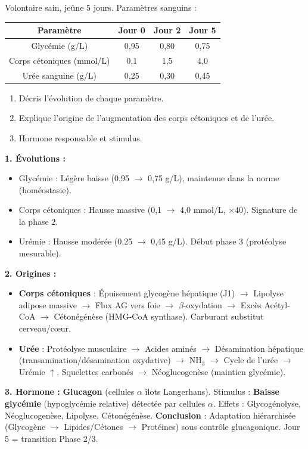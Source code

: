 \documentclass[11pt]{article}
\begin{document}
\begin{exoresolu}
Volontaire sain, jeûne 5 jours. Paramètres sanguins :
\begin{center}
\begin{tabular}{|c|c|c|c|}\hline
\rowcolor{popblueL} Paramètre & Jour 0 & Jour 2 & Jour 5 \\ \hline
Glycémie (g/L) & 0,95 & 0,80 & 0,75 \\ \hline
Corps cétoniques (mmol/L) & 0,1 & 1,5 & 4,0 \\ \hline
Urée sanguine (g/L) & 0,25 & 0,30 & 0,45 \\ \hline
\end{tabular}
\end{center}
\begin{enumerate}
\item Décris l'évolution de chaque paramètre.
\item Explique l'origine de l'augmentation des corps cétoniques et de l'urée.
\item Hormone responsable et stimulus.
\end{enumerate}
\tcblower
\textbf{1. Évolutions :}
\begin{itemize}
\item Glycémie : Légère baisse (0,95 $\rightarrow$ 0,75 g/L), maintenue dans la norme (homéostasie).
\item Corps cétoniques : Hausse massive (0,1 $\rightarrow$ 4,0 mmol/L, $\times 40$). Signature de la phase 2.
\item Urémie : Hausse modérée (0,25 $\rightarrow$ 0,45 g/L). Début phase 3 (protéolyse mesurable).
\end{itemize}
\textbf{2. Origines :}
\begin{itemize}
\item \textbf{Corps cétoniques} : Épuisement glycogène hépatique (J1) $\rightarrow$ Lipolyse adipose massive $\rightarrow$ Flux AG vers foie $\rightarrow$ $\beta$-oxydation $\rightarrow$ Excès Acétyl-CoA $\rightarrow$ Cétonégénèse (HMG-CoA synthase). Carburant substitut cerveau/cœur.
\item \textbf{Urée} : Protéolyse musculaire $\rightarrow$ Acides aminés $\rightarrow$ Désamination hépatique (transamination/désamination oxydative) $\rightarrow$ NH$_3$ $\rightarrow$ Cycle de l'urée $\rightarrow$ Urémie $\uparrow$. Squelettes carbonés $\rightarrow$ Néoglucogenèse (maintien glycémie).
\end{itemize}
\textbf{3. Hormone :} \textbf{Glucagon} (cellules $\alpha$ îlots Langerhans). Stimulus : \textbf{Baisse glycémie} (hypoglycémie relative) détectée par cellules $\alpha$. Effets : Glycogénolyse, Néoglucogenèse, Lipolyse, Cétonégénèse.
\textbf{Conclusion} : Adaptation hiérarchisée (Glycogène $\rightarrow$ Lipides/Cétones $\rightarrow$ Protéines) sous contrôle glucagonique. Jour 5 = transition Phase 2/3.
\end{exoresolu}
\end{document}
